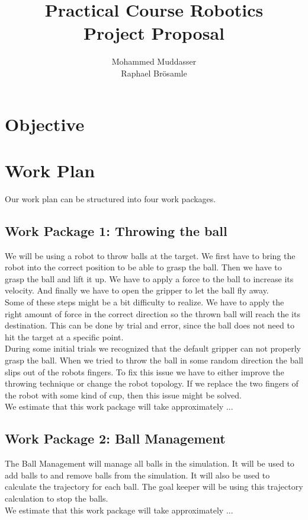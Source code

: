 \documentclass[12pt,pdftex,a4paper]{article}
\begin{document}
\title{Practical Course Robotics\\Project Proposal}
\author{Mohammed Muddasser\\Raphael Brösamle}
\date{}
\maketitle
\section*{Objective}

\newpage
\section*{Work Plan}
Our work plan can be structured into four work packages.

\subsection*{Work Package 1: Throwing the ball}
We will be using a robot to throw balls at the target.
We first have to bring the robot into the correct position to be able to grasp the ball. 
Then we have to grasp the ball and lift it up.
We have to apply a force to the ball to increase its velocity.
And finally we have to open the gripper to let the ball fly away. \\
$ $ \\
Some of these steps might be a bit difficulty to realize.
We have to apply the right amount of force in the correct direction so the thrown ball will reach the its destination.
This can be done by trial and error, since the ball does not need to hit the target at a specific point. \\
During some initial trials we recognized that the default gripper can not properly grasp the ball.
When we tried to throw the ball in some random direction the ball slips out of the robots fingers.
To fix this issue we have to either improve the throwing technique or change the robot topology.
If we replace the two fingers of the robot with some kind of cup, then this issue might be solved. \\
$ $ \\
We estimate that this work package will take approximately ...

\subsection*{Work Package 2: Ball Management}
The Ball Management will manage all balls in the simulation.
It will be used to add balls to and remove balls from the simulation.
It will also be used to calculate the trajectory for each ball.
The goal keeper will be using this trajectory calculation to stop the balls. \\
$ $ \\
We estimate that this work package will take approximately ...
\end{document}
